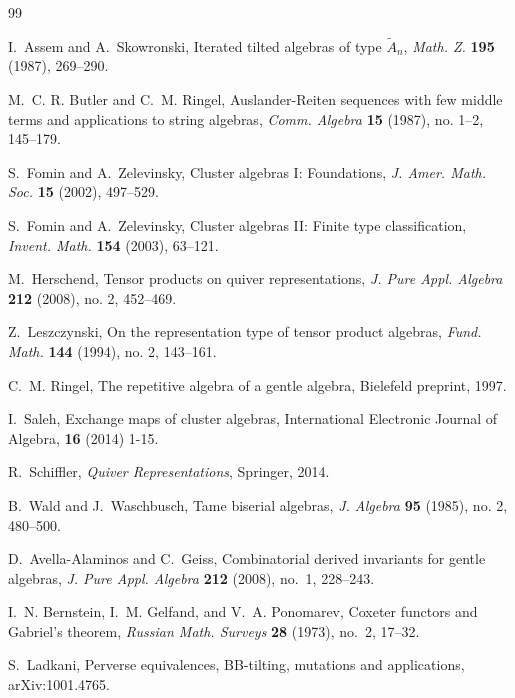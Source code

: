 \documentclass[11pt]{article}
\theoremstyle{plain}
\theoremstyle{definition}
\theoremstyle{remark}
\begin{document}
\begin{thebibliography}{99}

I.~Assem and A.~Skowronski,
\newblock Iterated tilted algebras of type \(\widetilde A_n\),
\newblock \emph{Math. Z.} \textbf{195} (1987), 269--290.

M.~C. R. Butler and C.~M. Ringel,
\newblock Auslander-Reiten sequences with few middle terms and applications to string algebras,
\newblock \emph{Comm. Algebra} \textbf{15} (1987), no. 1--2, 145--179.

S.~Fomin and A.~Zelevinsky,
\newblock Cluster algebras I: Foundations,
\newblock \emph{J. Amer. Math. Soc.} \textbf{15} (2002), 497--529.

S.~Fomin and A.~Zelevinsky,
\newblock Cluster algebras II: Finite type classification,
\newblock \emph{Invent. Math.} \textbf{154} (2003), 63--121.

M.~Herschend,
\newblock Tensor products on quiver representations,
\newblock \emph{J. Pure Appl. Algebra} \textbf{212} (2008), no. 2, 452--469.

Z.~Leszczynski,
\newblock On the representation type of tensor product algebras,
\newblock \emph{Fund. Math.} \textbf{144} (1994), no. 2, 143--161.

C.~M. Ringel,
\newblock The repetitive algebra of a gentle algebra,
\newblock Bielefeld preprint, 1997.


I.~Saleh,
\newblock Exchange maps of cluster algebras, 
\newblock International Electronic Journal of Algebra, \textbf{16} (2014) 1-15.

R.~Schiffler,
\newblock \emph{Quiver Representations},
\newblock Springer, 2014.


B.~Wald and J.~Waschbusch,
\newblock Tame biserial algebras,
\newblock \emph{J. Algebra} \textbf{95} (1985), no. 2, 480--500.


D.~Avella-Alaminos and C.~Geiss,
\newblock Combinatorial derived invariants for gentle algebras,
\newblock \emph{J. Pure Appl. Algebra} \textbf{212} (2008), no.~1, 228--243.

I.~N. Bernstein, I.~M. Gelfand, and V.~A. Ponomarev,
\newblock Coxeter functors and Gabriel's theorem,
\newblock \emph{Russian Math. Surveys} \textbf{28} (1973), no.~2, 17--32.

S.~Ladkani,
\newblock Perverse equivalences, BB-tilting, mutations and applications,
\newblock arXiv:1001.4765.

\end{thebibliography}
\end{document}
